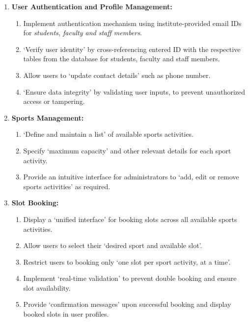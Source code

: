 \documentclass[12pt]{article}
\begin{document}
\begin{enumerate}[label=\arabic*.]
    \item \textbf{User Authentication and Profile Management:}
    \begin{enumerate}[label=\alph*)]
        \item Implement authentication mechanism using institute-provided email IDs for \textit{students, faculty and staff members}.
        \item `Verify user identity' by cross-referencing entered ID with the respective tables from the database for students, faculty and staff members.
        \item Allow users to `update contact details' such as phone number.
        \item `Ensure data integrity' by validating user inputs, to prevent unauthorized access or tampering.
    \end{enumerate}

    \vspace{0.4cm}

    \item \textbf{Sports Management:}
    \begin{enumerate}[label=\alph*)]
        \item `Define and maintain a list' of available sports activities.
        \item Specify `maximum capacity' and other relevant details for each sport activity.
        \item Provide an intuitive interface for administrators to `add, edit or remove sports activities' as required.
    \end{enumerate}

    \vspace{0.4cm}

    \item \textbf{Slot Booking:}
    \begin{enumerate}[label=\alph*)]
        \item Display a `unified interface' for booking slots across all available sports activities.
        \item Allow users to select their `desired sport and available slot'.
        \item Restrict users to booking only `one slot per sport activity, at a time'.
        \item Implement `real-time validation' to prevent double booking and ensure slot availability.
        \item Provide `confirmation messages' upon successful booking and display booked slots in user profiles.
    \end{enumerate}


\end{enumerate}
\end{document}
